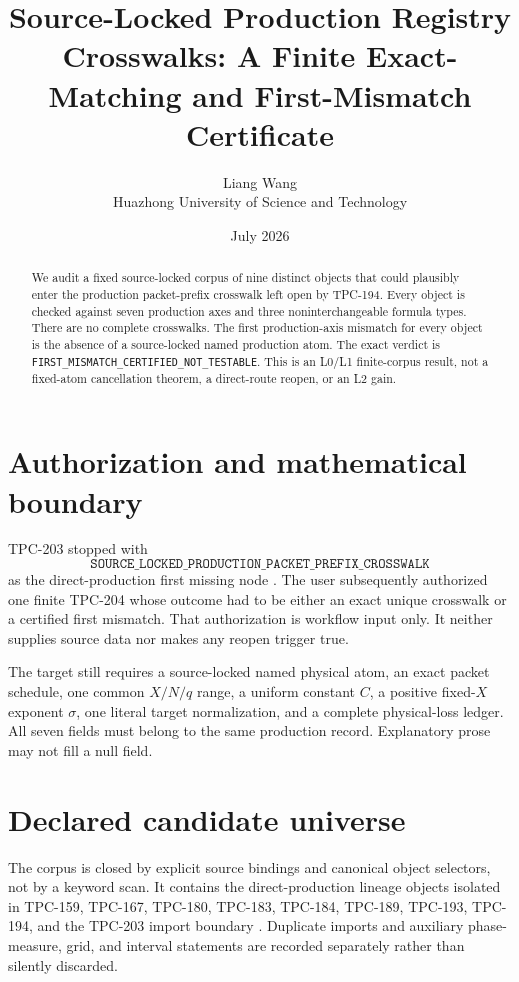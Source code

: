 \documentclass[11pt]{article}
\title{\textbf{Source-Locked Production Registry Crosswalks: A Finite Exact-Matching and First-Mismatch Certificate}}
\author{Liang Wang\\Huazhong University of Science and Technology}
\date{July 2026}
\begin{document}
\maketitle

\begin{abstract}
We audit a fixed source-locked corpus of nine distinct objects that could
plausibly enter the production packet-prefix crosswalk left open by TPC-194.
Every object is checked against seven production axes and three
noninterchangeable formula types.  There are no complete crosswalks.  The
first production-axis mismatch for every object is the absence of a
source-locked named production atom.  The exact verdict is
\texttt{FIRST\_\allowbreak{}MISMATCH\_\allowbreak{}CERTIFIED\_\allowbreak{}NOT\_\allowbreak{}TESTABLE}.
This is an L0/L1 finite-corpus result, not a fixed-atom cancellation theorem,
a direct-route reopen, or an L2 gain.
\end{abstract}

\section{Authorization and mathematical boundary}

TPC-203 stopped with
\[
\texttt{SOURCE\_LOCKED\_PRODUCTION\_PACKET\_PREFIX\_CROSSWALK}
\]
as the direct-production first missing node \citep{WangTPC203}.  The user
subsequently authorized one finite TPC-204 whose outcome had to be either an
exact unique crosswalk or a certified first mismatch.  That authorization is
workflow input only.  It neither supplies source data nor makes any reopen
trigger true.

The target still requires a source-locked named physical atom, an exact packet
schedule, one common \(X/N/q\) range, a uniform constant \(C\), a positive
fixed-\(X\) exponent \(\sigma\), one literal target normalization, and a
complete physical-loss ledger.  All seven fields must belong to the same
production record.  Explanatory prose may not fill a null field.

\section{Declared candidate universe}

The corpus is closed by explicit source bindings and canonical object
selectors, not by a keyword scan.  It contains the direct-production lineage
objects isolated in TPC-159, TPC-167, TPC-180, TPC-183, TPC-184, TPC-189,
TPC-193, TPC-194, and the TPC-203 import boundary
\citep{WangTPC159,WangTPC167,WangTPC180,WangTPC183,WangTPC184,WangTPC189,WangTPC193,WangTPC194,WangTPC203}.
Duplicate imports and auxiliary phase-measure, grid, and interval statements
are recorded separately rather than silently discarded.
\end{document}
